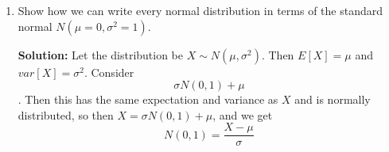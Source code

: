 \documentclass{article}
\newenvironment{solution}{

            \color{blue} \smallskip \textbf{Solution:}}{}
\begin{document}
\begin{enumerate}
\begin{solution}
            PDF: $f_X(x) = F'(x)$.

            The CDF must be between 0 and 1, the limit to the left must be 0, and the limit to the right must be 1.
            The PDF must be $\geq 0$, and $\int_{-\infty}^{\infty} f_X(x) dx = 1$.
        \end{solution}
        \item Show how we can write every normal distribution in terms of the standard normal $N(\mu=0, \sigma^2=1)$.
        \begin{solution}
            Let the distribution be $X \sim N(\mu, \sigma^2)$. Then $E[X] = \mu$ and $var[X] = \sigma^2$. Consider \[
                \sigma N(0, 1) + \mu
            \].
            Then this has the same expectation and variance as $X$ and is normally distributed, so then $X = \sigma N(0, 1) + \mu$, and we get \[
                N(0, 1) = \frac{X - \mu}{\sigma}
            \]
        \end{solution}
    \end{enumerate}
\end{document}
